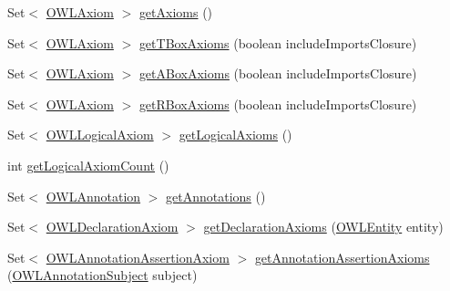 \begin{DoxyCompactItemize}
\item 
Set$<$ \hyperlink{interfaceorg_1_1semanticweb_1_1owlapi_1_1model_1_1_o_w_l_axiom}{O\-W\-L\-Axiom} $>$ \hyperlink{classuk_1_1ac_1_1manchester_1_1cs_1_1owl_1_1owlapi_1_1_o_w_l_ontology_impl_a0244a8caaf5beb560fe0c9b93cceb956}{get\-Axioms} ()
\item 
Set$<$ \hyperlink{interfaceorg_1_1semanticweb_1_1owlapi_1_1model_1_1_o_w_l_axiom}{O\-W\-L\-Axiom} $>$ \hyperlink{classuk_1_1ac_1_1manchester_1_1cs_1_1owl_1_1owlapi_1_1_o_w_l_ontology_impl_a6f1bf3106253f7bc7227569c73acd21b}{get\-T\-Box\-Axioms} (boolean include\-Imports\-Closure)
\item 
Set$<$ \hyperlink{interfaceorg_1_1semanticweb_1_1owlapi_1_1model_1_1_o_w_l_axiom}{O\-W\-L\-Axiom} $>$ \hyperlink{classuk_1_1ac_1_1manchester_1_1cs_1_1owl_1_1owlapi_1_1_o_w_l_ontology_impl_af4b7520ec41c97f03a59d9f022e1a4f4}{get\-A\-Box\-Axioms} (boolean include\-Imports\-Closure)
\item 
Set$<$ \hyperlink{interfaceorg_1_1semanticweb_1_1owlapi_1_1model_1_1_o_w_l_axiom}{O\-W\-L\-Axiom} $>$ \hyperlink{classuk_1_1ac_1_1manchester_1_1cs_1_1owl_1_1owlapi_1_1_o_w_l_ontology_impl_aa9d5898564d3a816da45da1c6aee70a3}{get\-R\-Box\-Axioms} (boolean include\-Imports\-Closure)
\item 
Set$<$ \hyperlink{interfaceorg_1_1semanticweb_1_1owlapi_1_1model_1_1_o_w_l_logical_axiom}{O\-W\-L\-Logical\-Axiom} $>$ \hyperlink{classuk_1_1ac_1_1manchester_1_1cs_1_1owl_1_1owlapi_1_1_o_w_l_ontology_impl_ae7d592cd3159524f288ac755b7d809a3}{get\-Logical\-Axioms} ()
\item 
int \hyperlink{classuk_1_1ac_1_1manchester_1_1cs_1_1owl_1_1owlapi_1_1_o_w_l_ontology_impl_a5df37556d225bf68c92362fd64980b34}{get\-Logical\-Axiom\-Count} ()
\item 
Set$<$ \hyperlink{interfaceorg_1_1semanticweb_1_1owlapi_1_1model_1_1_o_w_l_annotation}{O\-W\-L\-Annotation} $>$ \hyperlink{classuk_1_1ac_1_1manchester_1_1cs_1_1owl_1_1owlapi_1_1_o_w_l_ontology_impl_aa5c574efa25f478ddc00d4cca6bb145b}{get\-Annotations} ()
\item 
Set$<$ \hyperlink{interfaceorg_1_1semanticweb_1_1owlapi_1_1model_1_1_o_w_l_declaration_axiom}{O\-W\-L\-Declaration\-Axiom} $>$ \hyperlink{classuk_1_1ac_1_1manchester_1_1cs_1_1owl_1_1owlapi_1_1_o_w_l_ontology_impl_a9ada816771b01a36a01687c23d1d3b80}{get\-Declaration\-Axioms} (\hyperlink{interfaceorg_1_1semanticweb_1_1owlapi_1_1model_1_1_o_w_l_entity}{O\-W\-L\-Entity} entity)
\item 
Set$<$ \hyperlink{interfaceorg_1_1semanticweb_1_1owlapi_1_1model_1_1_o_w_l_annotation_assertion_axiom}{O\-W\-L\-Annotation\-Assertion\-Axiom} $>$ \hyperlink{classuk_1_1ac_1_1manchester_1_1cs_1_1owl_1_1owlapi_1_1_o_w_l_ontology_impl_a4d4ba5b63791c4de800cf432357c0e76}{get\-Annotation\-Assertion\-Axioms} (\hyperlink{interfaceorg_1_1semanticweb_1_1owlapi_1_1model_1_1_o_w_l_annotation_subject}{O\-W\-L\-Annotation\-Subject} subject)

\end{DoxyCompactItemize}

